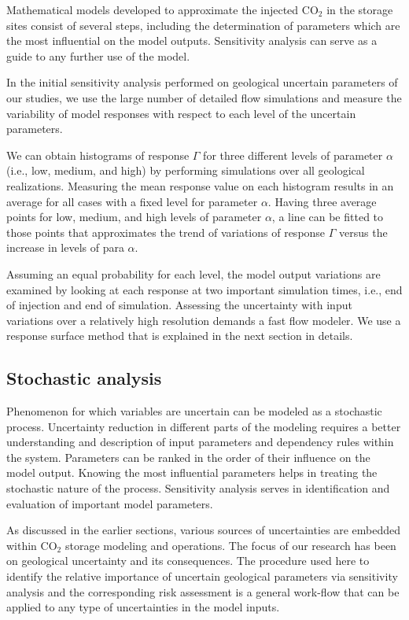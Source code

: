 Mathematical models developed to approximate the injected $\mbox{CO}_{2}$ in the
storage sites consist of several steps, including the determination of
parameters which are the most influential on the model outputs. Sensitivity
analysis can serve as a guide to any further use of the model.

In the initial sensitivity analysis performed on geological uncertain
parameters of our studies, we use the large number of detailed flow
simulations and measure the variability of model responses with respect to each
level of the uncertain parameters.

We can obtain histograms of response $\Gamma$  for three different levels of
parameter $\alpha$ (i.e., low, medium, and high) by performing simulations over
all geological realizations. Measuring the mean response value on
each histogram results in an average for all cases with a fixed level for
parameter $\alpha$. Having three average points for low, medium,
and high levels of parameter $\alpha$, a line can be fitted to those points 
that approximates the trend of variations of response $\Gamma$ versus the
increase in levels of para $\alpha$.

Assuming an equal probability for each level, the model output variations are
examined by looking at each response at two important simulation times, i.e., end of injection and end of simulation. Assessing the uncertainty with input variations over a relatively high resolution demands a fast flow modeler. We use a response surface method that is explained in the next section in details. 

\subsection{Stochastic analysis}

Phenomenon for which variables are uncertain can be modeled as a stochastic process. Uncertainty reduction in different parts of the modeling requires a better understanding and description of input parameters and dependency rules within
the system. Parameters can be ranked in the order of their influence on the
model output. Knowing the most influential parameters helps in treating the
stochastic nature of the process. Sensitivity analysis serves in identification and evaluation of important model
parameters. 

As discussed in the earlier sections, various sources of uncertainties are
embedded within $\mbox{CO}_{2}$ storage modeling and operations. The focus of
our research has been on geological uncertainty and its consequences. The
procedure used here to identify the relative importance of uncertain geological
parameters via sensitivity analysis and the corresponding risk assessment is a
general work-flow that can be applied to any type of uncertainties in the model
inputs.

